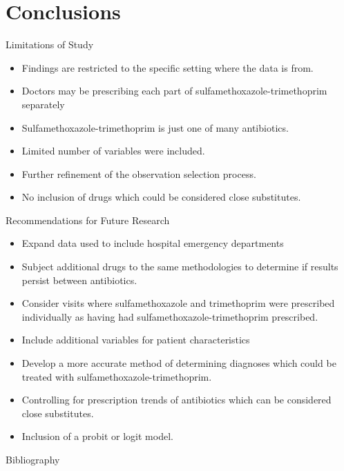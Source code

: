 \documentclass{beamer}
\begin{document}
\section{Conclusions}
\begin{frame}{Limitations of Study}
\begin{itemize}
\item Findings are restricted to the specific setting where the data is from.
\item Doctors may be prescribing each part of sulfamethoxazole-trimethoprim separately
\item Sulfamethoxazole-trimethoprim is just one of many antibiotics.
\item Limited number of variables were included.
\item Further refinement of the observation selection process.
\item No inclusion of drugs which could be considered close substitutes.
\end{itemize}
\end{frame}

\begin{frame}{Recommendations for Future Research}
\begin{itemize}
\item Expand data used to include hospital emergency departments
\item Subject additional drugs to the same methodologies to determine if results persist between antibiotics.
\item Consider visits where sulfamethoxazole and trimethoprim were prescribed individually as having had sulfamethoxazole-trimethoprim prescribed.
\item Include additional variables for patient characteristics
\item Develop a more accurate method of determining diagnoses which could be treated with sulfamethoxazole-trimethoprim.
\item Controlling for prescription trends of antibiotics which can be considered close substitutes.
\item Inclusion of a probit or logit model.
\end{itemize}
\end{frame}

\begin{frame}[allowframebreaks]{Bibliography}


\end{frame}
\end{document}
